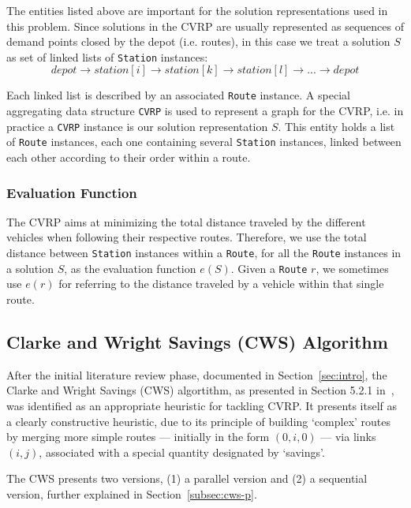 The entities listed above are important for the solution representations used in 
this problem. Since solutions in the CVRP are usually represented as sequences 
of demand points closed by the depot (i.e. routes), in this case 
we treat a solution $S$ as set of linked lists of \verb?Station? instances:
\[ depot \rightarrow station[i] \rightarrow station[k] \rightarrow station[l] \rightarrow ... \rightarrow depot \] 

Each 
linked list is described by an associated \verb?Route? instance. A special 
aggregating data structure \verb?CVRP? is used to represent a graph for the 
CVRP, i.e. in practice a \verb+CVRP+ instance is our solution representation 
$S$. This entity holds a list of \verb?Route? instances, each one 
containing several \verb?Station? instances, linked between each other 
according to their order within a route.\vertbreak

\subsubsection{Evaluation Function}
\label{subsubsec:eval-fun}

The CVRP aims at minimizing the total distance traveled by the different 
vehicles when following their respective routes. Therefore, we use the total 
distance between \verb+Station+ instances within a \verb+Route+, for all the 
\verb+Route+ instances in a solution $S$, as the evaluation function 
$e(S)$. Given a \verb+Route+ $r$, we sometimes use $e(r)$ for referring to 
the distance traveled by a vehicle within that single route.\vertbreak

\subsection{Clarke and Wright Savings (CWS) Algorithm}
\label{subsec:overview}

After the initial literature review phase, documented in
 Section~\ref{sec:intro}, the Clarke and Wright Savings (CWS) algortithm, as 
presented in Section 5.2.1 in~\cite{Toth2002}, was identified as an appropriate 
heuristic for tackling CVRP. It presents itself as a clearly constructive 
heuristic, due to its principle of building `complex' routes by merging more 
simple routes --- initially in the form $(0, i, 0)$ --- via links $(i,j)$, 
associated with a special quantity designated by `savings'.\vertbreak

The CWS presents two versions, (1) a parallel version and (2) a sequential 
version, further explained in Section~\ref{subsec:cws-p}.

